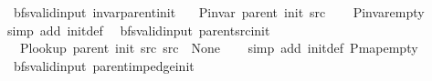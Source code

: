 \begin{isabellebody}
\endisatagproof
{\isafoldproof}%
%
\isadelimproof
\isanewline
%
\endisadelimproof
%
\isadeliminvisible
\isanewline
%
\endisadeliminvisible
%
\isataginvisible
{}\isamarkupfalse%
\ {\isacharparenleft}{\kern0pt}\ bfs{\isacharunderscore}{\kern0pt}valid{\isacharunderscore}{\kern0pt}input{\isacharparenright}{\kern0pt}\ invar{\isacharunderscore}{\kern0pt}parent{\isacharunderscore}{\kern0pt}init{\isacharcolon}{\kern0pt}\isanewline
\ \ \ {\isachardoublequoteopen}P{\isacharunderscore}{\kern0pt}invar\ {\isacharparenleft}{\kern0pt}parent\ {\isacharparenleft}{\kern0pt}init\ src{\isacharparenright}{\kern0pt}{\isacharparenright}{\kern0pt}{\isachardoublequoteclose}%
\endisataginvisible
{\isafoldinvisible}%
%
\isadeliminvisible
\isanewline
%
\endisadeliminvisible
%
\isadelimproof
\ \ %
\endisadelimproof
%
\isatagproof
{}\isamarkupfalse%
\ P{\isachardot}{\kern0pt}invar{\isacharunderscore}{\kern0pt}empty\isanewline
\ \ \isamarkupfalse%
\ {\isacharparenleft}{\kern0pt}simp\ add{\isacharcolon}{\kern0pt}\ init{\isacharunderscore}{\kern0pt}def{\isacharparenright}{\kern0pt}%
\endisatagproof
{\isafoldproof}%
%
\isadelimproof
\isanewline
%
\endisadelimproof
%
\isadeliminvisible
\isanewline
%
\endisadeliminvisible
%
\isataginvisible
{}\isamarkupfalse%
\ {\isacharparenleft}{\kern0pt}\ bfs{\isacharunderscore}{\kern0pt}valid{\isacharunderscore}{\kern0pt}input{\isacharparenright}{\kern0pt}\ parent{\isacharunderscore}{\kern0pt}src{\isacharunderscore}{\kern0pt}init{\isacharcolon}{\kern0pt}\isanewline
\ \ \ {\isachardoublequoteopen}P{\isacharunderscore}{\kern0pt}lookup\ {\isacharparenleft}{\kern0pt}parent\ {\isacharparenleft}{\kern0pt}init\ src{\isacharparenright}{\kern0pt}{\isacharparenright}{\kern0pt}\ src\ {\isacharequal}{\kern0pt}\ None{\isachardoublequoteclose}%
\endisataginvisible
{\isafoldinvisible}%
%
\isadeliminvisible
\isanewline
%
\endisadeliminvisible
%
\isadelimproof
\ \ %
\endisadelimproof
%
\isatagproof
{}\isamarkupfalse%
\ {\isacharparenleft}{\kern0pt}simp\ add{\isacharcolon}{\kern0pt}\ init{\isacharunderscore}{\kern0pt}def\ P{\isachardot}{\kern0pt}map{\isacharunderscore}{\kern0pt}empty{\isacharparenright}{\kern0pt}%
\endisatagproof
{\isafoldproof}%
%
\isadelimproof
\isanewline
%
\endisadelimproof
%
\isadeliminvisible
\isanewline
%
\endisadeliminvisible
%
\isataginvisible
{}\isamarkupfalse%
\ {\isacharparenleft}{\kern0pt}\ bfs{\isacharunderscore}{\kern0pt}valid{\isacharunderscore}{\kern0pt}input{\isacharparenright}{\kern0pt}\ parent{\isacharunderscore}{\kern0pt}imp{\isacharunderscore}{\kern0pt}edge{\isacharunderscore}{\kern0pt}init{\isacharcolon}{\kern0pt}\isanewline

\end{isabellebody}
